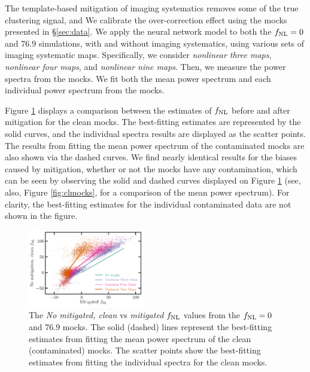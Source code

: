 The template-based mitigation of imaging systematics removes some of the true clustering signal, and  We calibrate the over-correction effect using the mocks presented in \S \ref{sec:data}.   We apply the neural network model to both the $f_{\rm NL}=0$ and $76.9$ simulations, with and without imaging systematics, using various sets of imaging systematic maps. Specifically, we consider \textit{nonlinear three maps}, \textit{nonlinear four maps}, and \textit{nonlinear nine maps}. Then, we measure the power spectra from the mocks. We fit both the mean power spectrum and each individual power spectrum from the mocks. 

Figure \ref{fig:fnlbias} displays a comparison between the estimates of $f_{\rm NL}$ before and after mitigation for the clean mocks. The best-fitting estimates  are represented by the solid curves, and the individual spectra results are displayed as the scatter points. The results from fitting the mean power spectrum of the contaminated mocks are also shown via the dashed curves. We find nearly identical results for the biases caused by mitigation, whether or not the mocks have any contamination, which can be seen by observing the solid and dashed curves displayed on Figure \ref{fig:fnlbias} (see, also, Figure \ref{fig:clmocks}, for a comparison of the mean power spectrum). For clarity, the best-fitting estimates for the individual contaminated data are not shown in the figure.

\begin{figure}
\centering
\includegraphics[width=0.45\textwidth]{figures/fnlbias}
\caption{The \textit{No mitigated, clean} vs \textit{mitigated} $f_{\rm NL}$ values from the $f_{\rm NL}=0$ and $76.9$ mocks. The solid (dashed) lines represent the best-fitting estimates from fitting the mean power spectrum of the clean (contaminated) mocks. The scatter points show the best-fitting estimates from fitting the individual spectra for the clean mocks.}\label{fig:fnlbias}
\end{figure}


